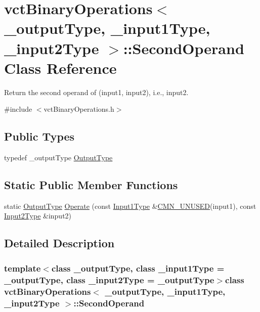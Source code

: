 \hypertarget{classvct_binary_operations_1_1_second_operand}{\section{vct\-Binary\-Operations$<$ \-\_\-output\-Type, \-\_\-input1\-Type, \-\_\-input2\-Type $>$\-:\-:Second\-Operand Class Reference}
\label{classvct_binary_operations_1_1_second_operand}
}


Return the second operand of (input1, input2), i.\-e., input2.  




{\ttfamily \#include $<$vct\-Binary\-Operations.\-h$>$}

\subsection*{Public Types}
\begin{DoxyCompactItemize}
\item 
typedef \-\_\-output\-Type \hyperlink{classvct_binary_operations_1_1_second_operand_acc7e6d4248e776359bcefe27a2ea9f53}{Output\-Type}
\end{DoxyCompactItemize}
\subsection*{Static Public Member Functions}
\begin{DoxyCompactItemize}
\item 
static \hyperlink{classvct_binary_operations_1_1_second_operand_acc7e6d4248e776359bcefe27a2ea9f53}{Output\-Type} \hyperlink{classvct_binary_operations_1_1_second_operand_a0de9cd948a8e946006c19fea34be7a90}{Operate} (const \hyperlink{classvct_binary_operations_a5e56a66a012d6a28c539a08a0021c45e}{Input1\-Type} \&\hyperlink{cmn_portability_8h_a021894e2626935fa2305434b1e893ff6}{C\-M\-N\-\_\-\-U\-N\-U\-S\-E\-D}(input1), const \hyperlink{classvct_binary_operations_a929119af557a04a16b4d854981e49e1b}{Input2\-Type} \&input2)
\end{DoxyCompactItemize}


\subsection{Detailed Description}
\subsubsection*{template$<$class \-\_\-output\-Type, class \-\_\-input1\-Type = \-\_\-output\-Type, class \-\_\-input2\-Type = \-\_\-output\-Type$>$class vct\-Binary\-Operations$<$ \-\_\-output\-Type, \-\_\-input1\-Type, \-\_\-input2\-Type $>$\-::\-Second\-Operand}

